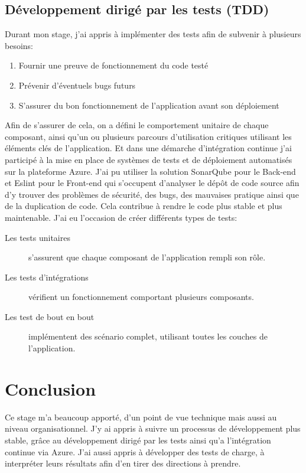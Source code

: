 \documentclass[12pt, a4paper]{report}
\begin{document}
        \section{Développement dirigé par les tests (TDD)}
            Durant mon stage, j'ai appris à implémenter des tests afin de subvenir à plusieurs besoins\@:
            \begin{enumerate}
                \item Fournir une preuve de fonctionnement du code testé
                \item Prévenir d'éventuels bugs futurs
                \item S'assurer du bon fonctionnement de l'application avant son déploiement
            \end{enumerate}
            Afin de s'assurer de cela, on a défini le comportement unitaire de chaque composant, ainsi qu'un ou plusieurs parcours d'utilisation critiques utilisant les éléments clés de l'application.\newline
            Et dans une démarche d'intégration continue j'ai participé à la mise en place de systèmes de tests et de déploiement automatisés sur la plateforme Azure.\newline
                J'ai pu utiliser la solution SonarQube pour le Back-end et Eslint pour le Front-end qui s'occupent d'analyser le dépôt de code source afin d'y trouver des problèmes de sécurité, des bugs, des mauvaises pratique ainsi que de la duplication de code.\newline
                Cela contribue à rendre le code plus stable et plus maintenable.\newline
                J'ai eu l'occasion de créer différents types de tests\@:
                \begin{description}
                    \item [Les tests unitaires] s'assurent que chaque composant de l'application rempli son rôle.
                    \item [Les tests d'intégrations] vérifient un fonctionnement comportant plusieurs composants.
                    \item [Les test de bout en bout] implémentent des scénario complet, utilisant toutes les couches de l'application.
                \end{description}
    \chapter{Conclusion}
        Ce stage m'a beaucoup apporté, d'un point de vue technique mais aussi au niveau organisationnel.\newline
        J'y ai appris à suivre un processus de développement plus stable, grâce au développement dirigé par les tests ainsi qu'a l'intégration continue via Azure.\newline
        J'ai aussi appris à développer des tests de charge, à interpréter leurs résultats afin d'en tirer des directions à prendre.\newline
	\makeutbmbackcover{}
\end{document}
